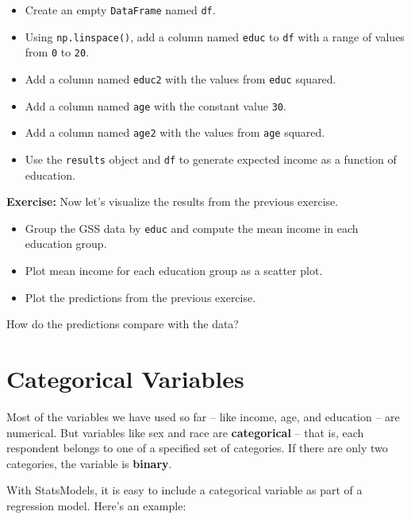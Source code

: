 \begin{itemize}
\item
  Create an empty \passthrough{\lstinline!DataFrame!} named
  \passthrough{\lstinline!df!}.
\item
  Using \passthrough{\lstinline!np.linspace()!}, add a column named
  \passthrough{\lstinline!educ!} to \passthrough{\lstinline!df!} with a
  range of values from \passthrough{\lstinline!0!} to
  \passthrough{\lstinline!20!}.
\item
  Add a column named \passthrough{\lstinline!educ2!} with the values
  from \passthrough{\lstinline!educ!} squared.
\item
  Add a column named \passthrough{\lstinline!age!} with the constant
  value \passthrough{\lstinline!30!}.
\item
  Add a column named \passthrough{\lstinline!age2!} with the values from
  \passthrough{\lstinline!age!} squared.
\item
  Use the \passthrough{\lstinline!results!} object and
  \passthrough{\lstinline!df!} to generate expected income as a function
  of education.
\end{itemize}

\textbf{Exercise:} Now let's visualize the results from the previous
exercise.

\begin{itemize}
\item
  Group the GSS data by \passthrough{\lstinline!educ!} and compute the
  mean income in each education group.
\item
  Plot mean income for each education group as a scatter plot.
\item
  Plot the predictions from the previous exercise.
\end{itemize}

How do the predictions compare with the data?

\section{Categorical Variables}\label{categorical-variables}

Most of the variables we have used so far -- like income, age, and
education -- are numerical. But variables like sex and race are
\textbf{categorical} -- that is, each respondent belongs to one of a
specified set of categories. If there are only two categories, the
variable is \textbf{binary}.

With StatsModels, it is easy to include a categorical variable as part
of a regression model. Here's an example:

